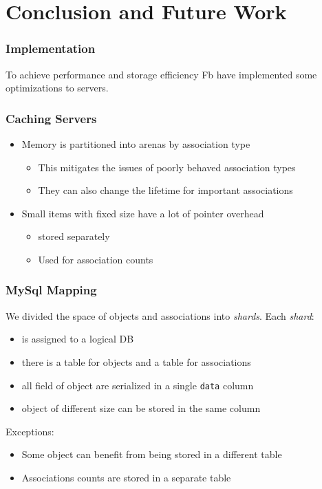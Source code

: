 \section{Conclusion and Future Work}
\begin{frame}
\frametitle{Implementation}
To achieve performance and storage efficiency Fb have implemented some optimizations to servers.  
\end{frame}

\begin{frame}[c]\frametitle{Caching Servers}
\begin{itemize}
	\item Memory is partitioned into arenas by association type
	\begin{itemize}
		\item This mitigates the issues of poorly behaved association types
		\item They can also change the lifetime for important associations
	\end{itemize}
	\item Small items with fixed size have a lot of pointer overhead
	\begin{itemize}
		\item stored separately
		\item Used for association counts
	\end{itemize}
\end{itemize}    
\end{frame}

\begin{frame}[fragile]\frametitle{MySql Mapping}
    We divided the space of objects and associations into \emph{shards}. Each \emph{shard}:
    \begin{itemize}
    	\item is assigned to a logical DB
    	\item there is a table for objects and a table for associations
    	\item all field of object are serialized in a single \verb!data! column
    	\item object of different size can be stored in the same column
    \end{itemize}
Exceptions:
\begin{itemize}
	\item Some object can benefit from being stored in a different table
	\item Associations counts are stored in a separate table
\end{itemize}
\end{frame}

